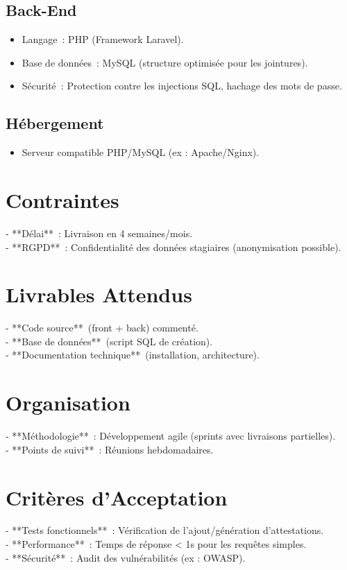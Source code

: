 \documentclass{report}
\begin{document}
\subsection*{Back-End}
\begin{itemize}
  \item Langage : PHP (Framework Laravel).
  \item Base de données : MySQL (structure optimisée pour les jointures).
  \item Sécurité : Protection contre les injections SQL, hachage des mots de passe.
\end{itemize}
\subsection*{Hébergement}
\begin{itemize}
  \item Serveur compatible PHP/MySQL (ex : Apache/Nginx).
\end{itemize}
\section*{Contraintes}
\noindent- **Délai** : Livraison en 4 semaines/mois.\\
- **RGPD** : Confidentialité des données stagiaires (anonymisation possible).\\
\section*{ Livrables Attendus}
\noindent- **Code source** (front + back) commenté.\\
- **Base de données** (script SQL de création).\\
- **Documentation technique** (installation, architecture).\\
\section*{Organisation}
\noindent- **Méthodologie** : Développement agile (sprints avec livraisons partielles).\\
- **Points de suivi** : Réunions hebdomadaires.
\section*{Critères d’Acceptation}
\noindent- **Tests fonctionnels** : Vérification de l’ajout/génération d’attestations.\\
- **Performance** : Temps de réponse < 1s pour les requêtes simples.\\
- **Sécurité** : Audit des vulnérabilités (ex : OWASP).
\end{document}
